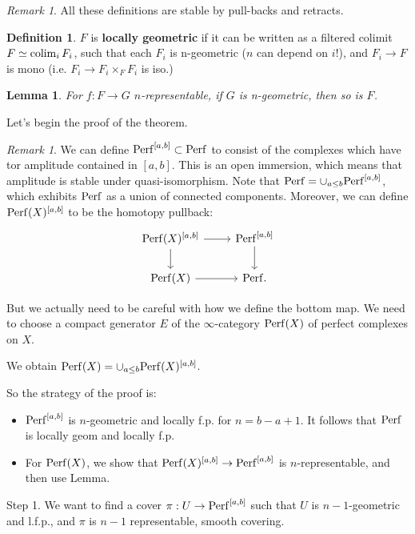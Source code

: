 \documentclass[10pt,a4paper,reqno,oneside]{book} %
\theoremstyle{plain}
\newtheorem{lem}[thm]{Lemma}
\theoremstyle{definition}
\newtheorem{defin}[thm]{Definition}
\theoremstyle{remark}
\newtheorem{rem}[thm]{Remark}
\numberwithin{equation}{section}
\begin{document}
\begin{rem}
All these definitions are stable by pull-backs and retracts.
\end{rem}

\begin{defin}
$F$ is \textbf{locally geometric} if it can be written as a filtered colimit $F \simeq \operatorname*{colim}_i F_i$, such that each $F_i$
is n-geometric ($n$ can depend on $i$!), and $F_i \to F$ is mono (i.e. $F_i \to F_i \times_F F_i$ is iso.)
\end{defin}

\begin{lem}
For $f : F \to G$ $n$-representable, if $G$ is n-geometric, then so is $F$.
\end{lem}

Let's begin the proof of the theorem.

\begin{rem}
We can define $\mathrm{Perf}^{[a,b]} \subset \mathrm{Perf}$ to consist of the complexes which have tor amplitude contained in $[a,b]$. This
is an open immersion, which means that amplitude is stable under quasi-isomorphism.
Note that $\mathrm{Perf} = \cup_{a\leq b} \mathrm{Perf}^{[a,b]}$, which exhibits $\mathrm{Perf}$ as a union of connected components.
 Moreover, we can define $\mathrm{Perf}(X)^{[a,b]}$ to be the homotopy pullback:
\[
\begin{tikzcd}
\Perf(X)^{[a,b]} \arrow{r}\arrow{d} & \Perf^{[a,b]}\arrow{d} \\
\Perf(X) \arrow{r} & \Perf .
\end{tikzcd}
\]

But we actually need to be careful with how we define the bottom map. We need to choose a compact generator $E$ of
the $\infty$-category $\mathrm{Perf}(X)$ of perfect complexes on $X$. 

We obtain $\mathrm{Perf}(X) = \cup_{a\leq b} \mathrm{Perf}(X)^{[a,b]}$.
\end{rem}

So the strategy of the proof is:
\begin{itemize}
\item $\mathrm{Perf}^{[a,b]}$ is $n$-geometric and locally f.p. for $n = b-a+1$. It follows that $\mathrm{Perf}$ is locally geom and locally f.p.
\item For $\mathrm{Perf}(X)$, we show that $\mathrm{Perf}(X)^{[a,b]} \to \mathrm{Perf}^{[a,b]}$ is $n$-representable, and then use Lemma. 
\end{itemize}

Step 1. We want to find a cover $\pi : U \to \mathrm{Perf}^{[a,b]}$ such that $U$ is $n-1$-geometric and l.f.p., and $\pi$ is $n-1$
representable, smooth covering.
\end{document}
